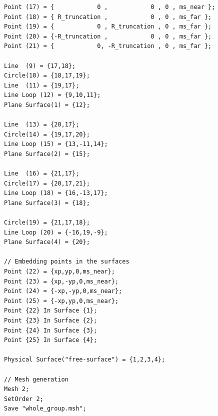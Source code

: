 \documentclass[a4]{article}
\begin{document}
\begin{Verbatim}
Point (17) = {            0 ,            0 , 0 , ms_near };
Point (18) = { R_truncation ,            0 , 0 , ms_far };
Point (19) = {            0 , R_truncation , 0 , ms_far };
Point (20) = {-R_truncation ,            0 , 0 , ms_far };
Point (21) = {            0, -R_truncation , 0 , ms_far };

Line  (9) = {17,18};
Circle(10) = {18,17,19};
Line  (11) = {19,17};
Line Loop (12) = {9,10,11}; 
Plane Surface(1) = {12};

Line  (13) = {20,17};
Circle(14) = {19,17,20};
Line Loop (15) = {13,-11,14}; 
Plane Surface(2) = {15};

Line  (16) = {21,17};
Circle(17) = {20,17,21};
Line Loop (18) = {16,-13,17}; 
Plane Surface(3) = {18};

Circle(19) = {21,17,18};
Line Loop (20) = {-16,19,-9}; 
Plane Surface(4) = {20};

// Embedding points in the surfaces 
Point (22) = {xp,yp,0,ms_near};
Point (23) = {xp,-yp,0,ms_near};
Point (24) = {-xp,-yp,0,ms_near};
Point (25) = {-xp,yp,0,ms_near};
Point {22} In Surface {1};
Point {23} In Surface {2};
Point {24} In Surface {3};
Point {25} In Surface {4};

Physical Surface("free-surface") = {1,2,3,4};

// Mesh generation
Mesh 2;
SetOrder 2;
Save "whole_group.msh";
\end{Verbatim}
\end{document}
